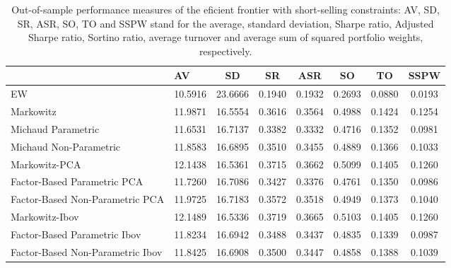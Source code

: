 \begin{table}

\caption{\label{tab:empirical_ef_2}Out-of-sample performance measures of the eficient frontier with short-selling constraints: AV, SD, SR, ASR, SO, TO and SSPW stand for the average, standard deviation, Sharpe ratio, Adjusted Sharpe ratio, Sortino ratio, average turnover and average sum of squared portfolio weights, respectively.}
\centering
\begin{tabular}[t]{l|l|c|c|c|c|c|c}
\hline
  & AV & SD & SR & ASR & SO & TO & SSPW\\
\hline
EW & 10.5916 & 23.6666 & 0.1940 & 0.1932 & 0.2693 & 0.0880 & 0.0193\\
\hline
Markowitz & 11.9871 & 16.5554 & 0.3616 & 0.3564 & 0.4988 & 0.1424 & 0.1254\\
\hline
Michaud Parametric & 11.6531 & 16.7137 & 0.3382 & 0.3332 & 0.4716 & 0.1352 & 0.0981\\
\hline
Michaud Non-Parametric & 11.8583 & 16.6895 & 0.3510 & 0.3455 & 0.4889 & 0.1366 & 0.1033\\
\hline
Markowitz-PCA & 12.1438 & 16.5361 & 0.3715 & 0.3662 & 0.5099 & 0.1405 & 0.1260\\
\hline
Factor-Based Parametric PCA & 11.7260 & 16.7086 & 0.3427 & 0.3376 & 0.4761 & 0.1350 & 0.0986\\
\hline
Factor-Based Non-Parametric PCA & 11.9725 & 16.7183 & 0.3572 & 0.3518 & 0.4949 & 0.1373 & 0.1040\\
\hline
Markowitz-Ibov & 12.1489 & 16.5336 & 0.3719 & 0.3665 & 0.5103 & 0.1405 & 0.1260\\
\hline
Factor-Based Parametric Ibov & 11.8234 & 16.6942 & 0.3488 & 0.3437 & 0.4835 & 0.1339 & 0.0987\\
\hline
Factor-Based Non-Parametric Ibov & 11.8425 & 16.6908 & 0.3500 & 0.3447 & 0.4858 & 0.1388 & 0.1039\\
\hline
\end{tabular}
\end{table}

